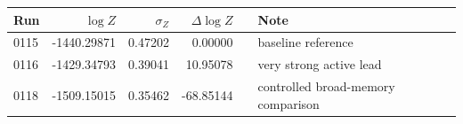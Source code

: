 \begin{tabular}{lrrrrl}
\toprule
Run & $\log Z$ & $\sigma_Z$ & $\Delta\log Z$ & & Note \\
\midrule
0115 & -1440.29871 & 0.47202 & 0.00000 & & baseline reference \\
0116 & -1429.34793 & 0.39041 & 10.95078 & & very strong active lead \\
0118 & -1509.15015 & 0.35462 & -68.85144 & & controlled broad-memory comparison \\
\bottomrule
\end{tabular}
